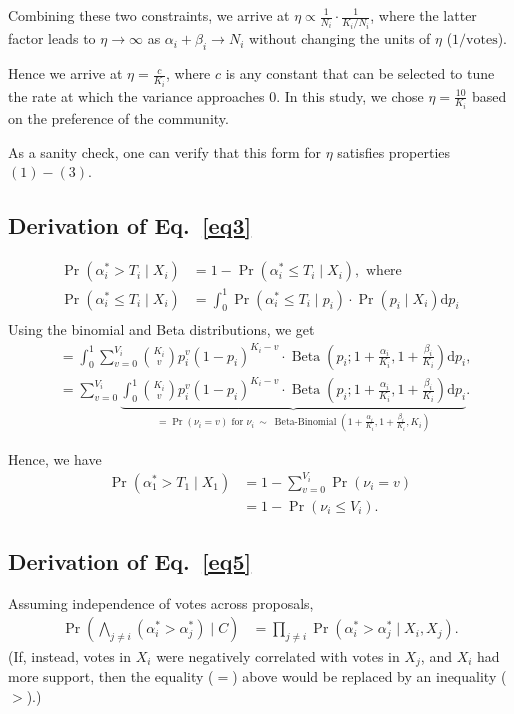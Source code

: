 \documentclass[format=acmsmall, review=true, screen=true, anonymous=true]{acmart}
\begin{document}
Combining these two constraints, we arrive at $\eta \propto \frac{1}{N_i}\cdot \frac{1}{K_i/N_i}$, where the latter factor leads to $\eta \rightarrow \infty$ as $\alpha_i + \beta_i \rightarrow N_i$ without changing the units of $\eta$ ($1/\text{votes}$).

Hence we arrive at $\eta = \frac{c}{K_i}$, where $c$ is any constant that can be selected to tune the rate at which the variance approaches $0$.  In this study, we chose $\eta = \frac{10}{K_i}$ based on the preference of the community.

As a sanity check, one can verify that this form for $\eta$ satisfies properties $(1)-(3)$.

\subsection{Derivation of Eq.~\eqref{eq3}}
\begin{align*}
\Pr(\alpha^*_i > T_i \mid X_i) &= 1 - \Pr(\alpha^*_i \leq T_i \mid X_i), \text{ where}\\
\Pr(\alpha^*_i \leq T_i \mid X_i) &= \int_0^1 \Pr(\alpha^*_i \leq T_i \mid p_i)\cdot \Pr(p_i \mid X_i) \mathrm{d}p_i\\
\end{align*}
Using the binomial and Beta distributions, we get
\begin{align*}
&= \int_0^1 \sum\limits_{v=0}^{V_i} {K_i \choose v} p_i^{v} {(1-p_i)}^{K_i-v} \cdot \operatorname{Beta}(p_i; 1+\frac{\alpha_i}{K_i},1+\frac{\beta_i}{K_i}) \mathrm{d}p_i,\\
&= \sum\limits_{v=0}^{V_i} \underbrace{\int_0^1 {K_i \choose v} p_i^{v} {(1-p_i)}^{K_i-v} \cdot \operatorname{Beta}(p_i; 1+\frac{\alpha_i}{K_i},1+\frac{\beta_i}{K_i}) \mathrm{d}p_i}_{= \Pr(\nu_i = v)\text{ for } \nu_i\ \sim\ \operatorname{Beta-Binomial}(1+\frac{\alpha_i}{K_i},1+\frac{\beta_i}{K_i}, K_i)}.
\end{align*}

Hence, we have
\begin{align*}
\Pr(\alpha^*_1 > T_1 \mid X_1) &= 1 - \sum\limits_{v=0}^{V_i} \Pr(\nu_i = v)\\
&= 1 - \Pr(\nu_i \leq V_i).
\end{align*}

\subsection{Derivation of Eq.~\eqref{eq5}}
Assuming independence of votes across proposals,
\begin{align*}
\Pr\left(\bigwedge_{j \neq i} (\alpha^*_i > \alpha^*_j) \mid C\right) &=\prod_{j \neq i} \Pr(\alpha^*_i > \alpha^*_j \mid X_i, X_j).
\end{align*}
(If, instead, votes in $X_i$ were negatively correlated with votes in $X_j$, and $X_i$ had more support, then the equality ($=$) above would be replaced by an inequality ($>$).)
\end{document}
